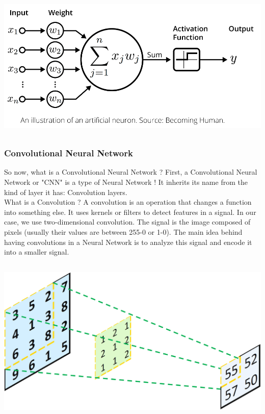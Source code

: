 \documentclass[12pt]{article}
\begin{document}
\centerline{\includegraphics[height=7cm]{../../docs/activation-function.png}}

\subsubsection{Convolutional Neural Network}
So now, what is a Convolutional Neural Network ?
First, a Convolutional Neural Network or "CNN" is a type of Neural Network ! It inherits its name from the kind of layer it has: Convolution layers. \\

What is a Convolution ? 
A convolution is an operation that changes a function into something else. It uses kernels or filters to detect features in a signal. In our case, we use two-dimensional convolution. The signal is the image composed of pixels (usually their values are between 255-0 or 1-0). The main idea behind having convolutions in a Neural Network is to analyze this signal and encode it into a smaller signal. \\
\centerline{\includegraphics[height=8cm]{../../docs/convolution.png}}
\end{document}
